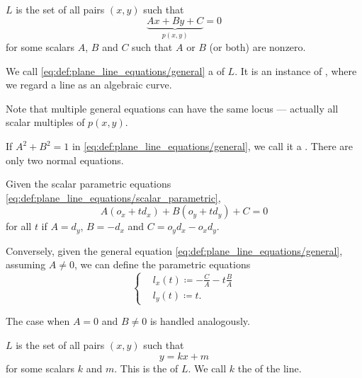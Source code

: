 \begin{definition}
\begin{thmenum}
     \( L \) is the set of all pairs \( (x, y) \) such that
    \begin{equation}\label{eq:def:plane_line_equations/general}
      \underbrace{ Ax + By + C }_{ p(x, y) } = 0
    \end{equation}
    for some scalars \( A \), \( B \) and \( C \) such that \( A \) or \( B \) (or both) are nonzero.

    We call \eqref{eq:def:plane_line_equations/general} a  of \( L \). It is an instance of , where we regard a line as an algebraic curve.

    Note that multiple general equations can have the same locus --- actually all scalar multiples of \( p(x, y) \).

    If \( A^2 + B^2 = 1 \) in \eqref{eq:def:plane_line_equations/general}, we call it a . There are only two normal equations.

    Given the scalar parametric equations \eqref{eq:def:plane_line_equations/scalar_parametric},
    \begin{equation*}
      A(o_x + td_x) + B(o_y + td_y) + C = 0
    \end{equation*}
    for all \( t \) if \( A = d_y \), \( B = -d_x \) and \( C = o_y d_x - o_x d_y \).

    Conversely, given the general equation \eqref{eq:def:plane_line_equations/general}, assuming \( A \neq 0 \), we can define the parametric equations
    \begin{equation*}
      \begin{cases}
        &l_x(t) \coloneqq -\frac C A - t \frac B A  \\
        &l_y(t) \coloneqq t.
      \end{cases}
    \end{equation*}

    The case when \( A = 0 \) and \( B \neq 0 \) is handled analogously.

     \( L \) is the set of all pairs \( (x, y) \) such that
    \begin{equation}\label{eq:def:plane_line_equations/cartesian}
      y = kx + m
    \end{equation}
    for some scalars \( k \) and \( m \). This is the  of \( L \). We call \( k \) the  of the line.


\end{thmenum}
\end{definition}
